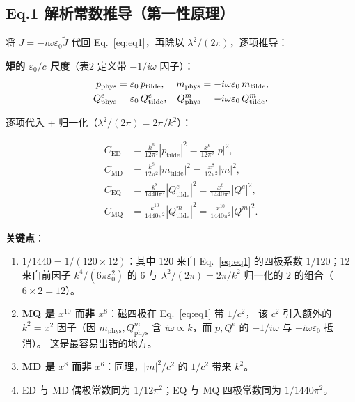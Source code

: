 \subsection{Eq.1 解析常数推导（第一性原理）}

将 $J=-i\omega\varepsilon_0\widetilde{J}$ 代回 Eq.~\eqref{eq:eq1}，再除以
$\lambda^2/(2\pi)$，逐项推导：

\textbf{矩的 $\varepsilon_0/c$ 尺度}（表2 定义带 $-1/i\omega$ 因子）：
\begin{align}
  p_{\mathrm{phys}} &= \varepsilon_0\,p_{\mathrm{tilde}}, &
  m_{\mathrm{phys}} &= -i\omega\varepsilon_0\,m_{\mathrm{tilde}}, \notag\\
  Q^e_{\mathrm{phys}} &= \varepsilon_0\,Q^e_{\mathrm{tilde}}, &
  Q^m_{\mathrm{phys}} &= -i\omega\varepsilon_0\,Q^m_{\mathrm{tilde}}.
  \label{eq:mom_scale}
\end{align}

逐项代入 + 归一化（$\lambda^2/(2\pi)=2\pi/k^2$）：

\begin{align}
  C_{\mathrm{ED}} &= \frac{k^6}{12\pi^2}|p_{\mathrm{tilde}}|^2
     = \frac{x^6}{12\pi^2}|p|^2, \label{eq:der_ed}\\
  C_{\mathrm{MD}} &= \frac{k^8}{12\pi^2}|m_{\mathrm{tilde}}|^2
     = \frac{x^8}{12\pi^2}|m|^2, \label{eq:der_md}\\
  C_{\mathrm{EQ}} &= \frac{k^8}{1440\pi^2}|Q^e_{\mathrm{tilde}}|^2
     = \frac{x^8}{1440\pi^2}|Q^e|^2, \label{eq:der_eq}\\
  C_{\mathrm{MQ}} &= \frac{k^{10}}{1440\pi^2}|Q^m_{\mathrm{tilde}}|^2
     = \frac{x^{10}}{1440\pi^2}|Q^m|^2. \label{eq:der_mq}
\end{align}

\textbf{关键点}：

\begin{enumerate}
  \item \textbf{$1/1440 = 1/(120\times 12)$}：其中 120 来自 Eq.~\eqref{eq:eq1}
        的四极系数 $1/120$；12 来自前因子 $k^4/(6\pi\varepsilon_0^2)$ 的 $6$
        与 $\lambda^2/(2\pi)=2\pi/k^2$ 归一化的 $2$ 的组合（$6\times2=12$）。
  \item \textbf{MQ 是 $x^{10}$ 而非 $x^8$}：磁四极在 Eq.~\eqref{eq:eq1} 带 $1/c^2$，
        该 $c^2$ 引入额外的 $k^2=x^2$ 因子（因 $m_{\mathrm{phys}},Q^m_{\mathrm{phys}}$
        含 $i\omega\propto k$，而 $p,Q^e$ 的 $-1/i\omega$ 与 $-i\omega\varepsilon_0$ 抵消）。
        这是最容易出错的地方。
  \item \textbf{MD 是 $x^8$ 而非 $x^6$}：同理，$|m|^2/c^2$ 的 $1/c^2$ 带来 $k^2$。
  \item ED 与 MD 偶极常数同为 $1/12\pi^2$；EQ 与 MQ 四极常数同为 $1/1440\pi^2$。
\end{enumerate}

